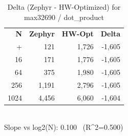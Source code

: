 \begin{table}[tb]
    \centering
    \caption{Delta (Zephyr - HW-Optimized) for max32690 / dot_product}
    \label{tab:delta_max32690_dot_product}
    \scriptsize
    \begin{tabular}{r r r r}
        \hline
        \textbf{N} & \textbf{Zephyr} & \textbf{HW-Opt} & \textbf{Delta} \\\n+        \hline
        4 & 121 & 1,726 & -1,605\\
        16 & 171 & 1,776 & -1,605\\
        64 & 375 & 1,980 & -1,605\\
        256 & 1,191 & 2,796 & -1,605\\
        1024 & 4,456 & 6,060 & -1,604\\
        \hline
    \end{tabular}
    \vspace{2mm}\\\n    Slope vs log2(N): 0.100 \ (R^2=0.500)\n\end{table}
